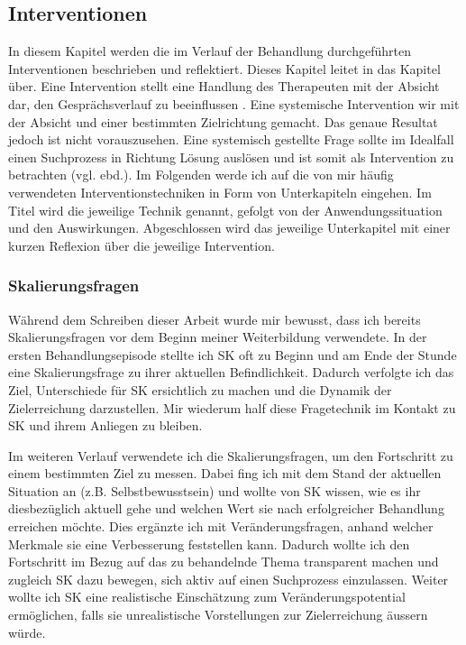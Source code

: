 \subsection{Interventionen} 
In diesem Kapitel werden die im Verlauf der Behandlung durchgeführten Interventionen beschrieben und reflektiert. Dieses Kapitel leitet in das Kapitel \textit{} über. Eine Intervention stellt eine Handlung des Therapeuten mit der Absicht dar, den Gesprächsverlauf zu beeinflussen \cite{Starke2019}. Eine systemische Intervention wir mit der Absicht und einer bestimmten Zielrichtung gemacht. Das genaue Resultat jedoch ist nicht vorauszusehen. Eine systemisch gestellte Frage sollte im Idealfall einen Suchprozess in Richtung Lösung auslösen und ist somit als Intervention zu betrachten (vgl. ebd.). Im Folgenden werde ich auf die von mir häufig verwendeten Interventionstechniken in Form von Unterkapiteln eingehen. Im Titel wird die jeweilige Technik genannt, gefolgt von der Anwendungssituation und den Auswirkungen. Abgeschlossen wird das jeweilige Unterkapitel mit einer kurzen Reflexion über die jeweilige Intervention.


\subsubsection{Skalierungsfragen} 
Während dem Schreiben dieser Arbeit wurde mir bewusst, dass ich bereits Skalierungsfragen vor dem Beginn meiner Weiterbildung verwendete. In der ersten Behandlungsepisode stellte ich SK oft zu Beginn und am Ende der Stunde eine Skalierungsfrage zu ihrer aktuellen Befindlichkeit. Dadurch verfolgte ich das Ziel, Unterschiede für SK ersichtlich zu machen und die Dynamik der Zielerreichung darzustellen. Mir wiederum half diese Fragetechnik im Kontakt zu SK und ihrem Anliegen zu bleiben. 

Im weiteren Verlauf verwendete ich die Skalierungsfragen, um den Fortschritt zu einem bestimmten Ziel zu messen. Dabei fing ich mit dem Stand der aktuellen Situation an (z.B. Selbstbewusstsein) und wollte von SK wissen, wie es ihr diesbezüglich aktuell gehe und welchen Wert sie nach erfolgreicher Behandlung erreichen möchte. Dies ergänzte ich mit Veränderungsfragen, anhand welcher Merkmale sie eine Verbesserung feststellen kann. Dadurch wollte ich den Fortschritt im Bezug auf das zu behandelnde Thema transparent machen und zugleich SK dazu bewegen, sich aktiv auf einen Suchprozess einzulassen. Weiter wollte ich SK eine realistische Einschätzung zum Veränderungspotential ermöglichen, falls sie unrealistische Vorstellungen zur Zielerreichung äussern würde.

